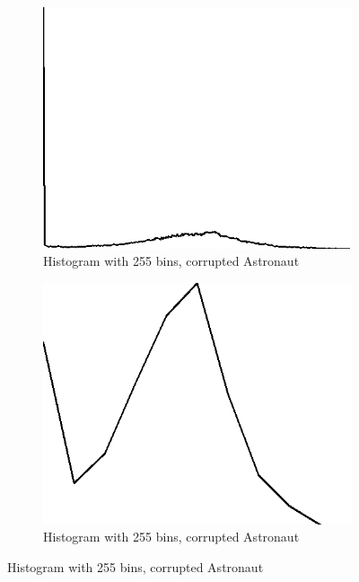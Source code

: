 \documentclass{article}
\begin{document}
\begin{figure}[H]
	\begin{subfigure}{0.4\textwidth}
		\includegraphics[width=\textwidth]{Generated/Astronaut_salt_pepper_histogramOneChannel255bins.png}
		\caption{Histogram with 255 bins, corrupted Astronaut}
		\label{fig:hist255_Astronaut}
	\end{subfigure}
	\hfill
	\begin{subfigure}{0.4\textwidth}
		\includegraphics[width=\textwidth]{Generated/Astronaut_salt_pepper_histogramOneChannel10bins.png}
		\caption{Histogram with 255 bins, corrupted Astronaut}
		\label{fig:hist10_Astronaut}
	\end{subfigure}


\end{figure}
\end{document}
